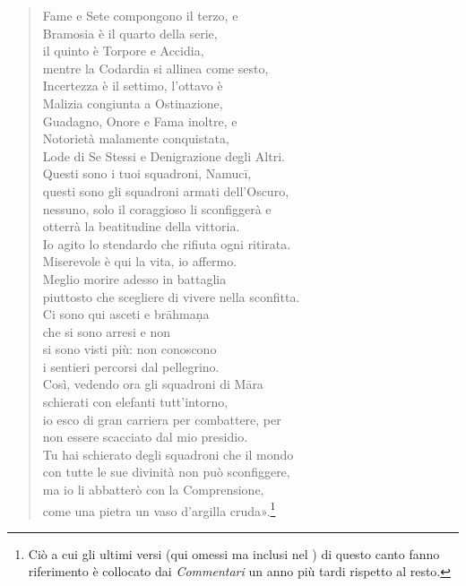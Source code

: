 \begin{quotation}
Fame e Sete compongono il terzo, e \\
Bramosia è il quarto della serie, \\
il quinto è Torpore e Accidia, \\
mentre la Codardia si allinea come sesto, \\
Incertezza è il settimo, l’ottavo è \\
Malizia congiunta a Ostinazione, \\
Guadagno, Onore e Fama inoltre, e \\
Notorietà malamente conquistata, \\
Lode di Se Stessi e Denigrazione degli Altri. \\
Questi sono i tuoi squadroni, Namucī, \\
questi sono gli squadroni armati dell’Oscuro, \\
nessuno, solo il coraggioso li sconfiggerà e \\
otterrà la beatitudine della vittoria. \\
Io agito lo stendardo che rifiuta ogni ritirata. \\
Miserevole è qui la vita, io affermo. \\
Meglio morire adesso in battaglia \\
piuttosto che scegliere di vivere nella sconfitta. \\
Ci sono qui asceti e brāhmaṇa \\
che si sono arresi e non \\
si sono visti più: non conoscono \\
i sentieri percorsi dal pellegrino. \\
Così, vedendo ora gli squadroni di Māra \\
schierati con elefanti tutt’intorno, \\
io esco di gran carriera per combattere, per \\
non essere scacciato dal mio presidio. \\
Tu hai schierato degli squadroni che il mondo \\
con tutte le sue divinità non può sconfiggere, \\
ma io li abbatterò con la Comprensione, \\
come una pietra un vaso d’argilla cruda».\footnote{Ciò a cui gli ultimi versi (qui omessi ma inclusi nel \hyperlink{cap-04-La-diffusione-del-Dhamma#pag70A}{}) di questo canto fanno riferimento è collocato dai \emph{Commentari} un anno più tardi rispetto al resto.}
\end{quotation}


